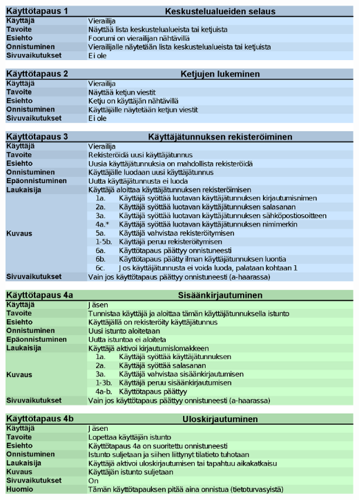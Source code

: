 \documentclass[11pt]{article}
\begin{document}
		\newpage
		\includegraphics[trim = 27mm 0mm 0mm 25mm]{kayttotapausmalli-sivu-1.eps}\\
\end{document}

